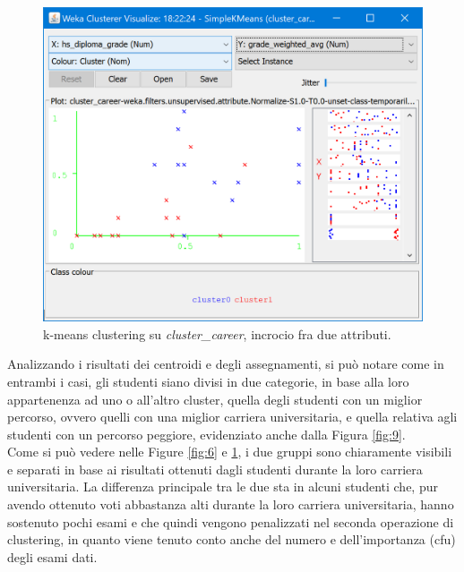\documentclass[]{article}
\begin{document}
\begin{figure}[!]
	\centering
	\includegraphics[scale=0.65]{Img/kmeans_career_allAttributi_incrocio.png}
	\caption{k-means clustering su \textit{cluster\_career}, incrocio fra due attributi.
		\label{fig:8}}
\end{figure} 

Analizzando i risultati dei centroidi e degli assegnamenti, si pu\`{o} notare come in entrambi i casi, gli studenti siano divisi in due categorie, in base alla loro appartenenza ad uno o all'altro cluster, quella degli studenti con un miglior percorso, ovvero quelli con una miglior carriera universitaria, e quella relativa agli studenti con un percorso peggiore, evidenziato anche dalla Figura \ref{fig:9}.\\ 
Come si pu\`{o} vedere nelle Figure \ref{fig:6} e \ref{fig:8}, i due gruppi sono chiaramente visibili e separati in base ai risultati ottenuti dagli studenti durante la loro carriera universitaria. La differenza principale tra le due sta in alcuni studenti che, pur avendo ottenuto voti abbastanza alti durante la loro carriera universitaria, hanno sostenuto pochi esami e che quindi vengono penalizzati nel seconda operazione di clustering, in quanto viene tenuto conto anche del numero e dell'importanza (cfu) degli esami dati. \\
\end{document}

